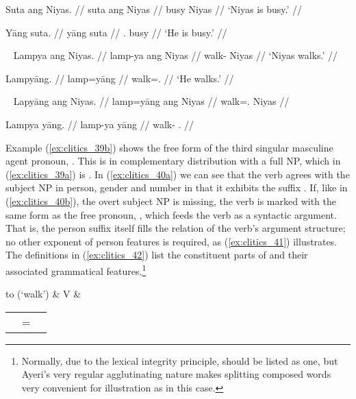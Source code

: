 \pex\label{ex:clitics_39}
\a\label{ex:clitics_39a}\begingl
	\gla Suta ang Niyas. //
	\glb suta ang Niyas //
	\glc busy \Aarg{} Niyas //
	\glft `Niyas is busy.' //
\endgl

\a\label{ex:clitics_39b}\begingl
	\gla Yāng suta. //
	\glb yāng suta //
	\glc \TsgM{}.\Aarg{} busy //
	\glft `He is busy.' //
\endgl
\xe

\pex~\label{ex:clitics_40}
\a\label{ex:clitics_40a}\begingl
	\gla Lampya ang Niyas. //
	\glb lamp-ya ang Niyas //
	\glc walk-\TsgM{} \Aarg{} Niyas //
	\glft `Niyas walks.' //
\endgl

\a\label{ex:clitics_40b}\begingl
	\gla Lampyāng. //
	\glb lamp=yāng //
	\glc walk=\TsgM{}.\Aarg{} //
	\glft `He walks.' //
\endgl
\xe

\pex~\label{ex:clitics_41}
\a\label{ex:clitics_41a}\ljudge{*}\begingl
	\gla Lapyāng ang Niyas. //
	\glb lamp=yāng ang Niyas //
	\glc walk=\TsgM{}.\Aarg{} \Aarg{} Niyas //
\endgl

\a\label{ex:clitics_41b}\ljudge{*}\begingl
	\gla Lampya yāng. //
	\glb lamp-ya yāng //
	\glc walk-\TsgM{} \TsgM{}.\Aarg{} //
\endgl
\xe

Example (\ref{ex:clitics_39b}) shows the free form of the third singular
masculine agent pronoun, . This is in complementary
distribution with a full NP, which in (\ref{ex:clitics_39a}) is . In (\ref{ex:clitics_40a}) we can see that the verb agrees
with the subject NP in person, gender and number in that it exhibits the suffix
. If, like in (\ref{ex:clitics_40b}), the overt subject NP is
missing, the verb is marked with the same form as the free pronoun,
, which feeds the verb as a syntactic argument. That is,
the person suffix itself fills the  \Subj{} relation of the verb's argument
structure; no other exponent of person features is required, as
(\ref{ex:clitics_41}) illustrates. The definitions in (\ref{ex:clitics_42})
list the constituent parts of  and their
associated grammatical features.\footnote{Normally, due to the lexical
integrity principle,  should be listed as one, but
Ayeri's very regular agglutinating nature makes splitting composed words very
convenient for illustration as in this case.}

\ex\label{ex:clitics_42}
\begin{tabu} to 
 (`walk')
	&	V
	&	\begin{tabular}[t]{l l l}
			\ups{\Pred}	& = & \astruct{walk}{\ups{\Subj{}}} \\
		\end{tabular}
\end{tabu}\medskip

